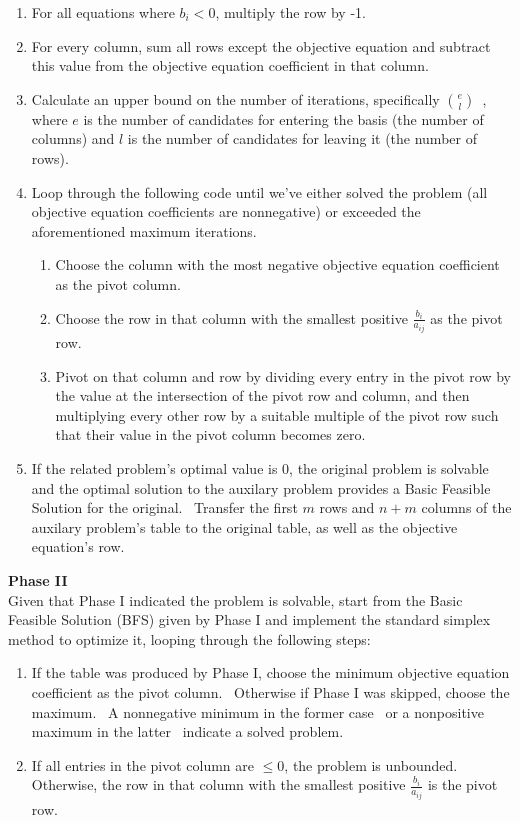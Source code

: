 \documentclass[11pt]{article}
\begin{document}
\begin{enumerate}
\item For all equations where $b_i < 0$, multiply the row by -1.~\cite{wolfram}
\item For every column, sum all rows except the objective equation and subtract this value from the objective equation coefficient in that column.~\cite{wolfram}
\item Calculate an upper bound on the number of iterations, specifically $e \choose l$~\cite{chvatal83}, where $e$ is the number of candidates for entering the basis (the number of columns) and $l$ is the number of candidates for leaving it (the number of rows). 
\item Loop through the following code until we've either solved the problem (all objective equation coefficients are nonnegative) or exceeded the aforementioned maximum iterations.
  \begin{enumerate}
  \item Choose the column with the most negative objective equation coefficient as the pivot column.~\cite{wolfram}
  \item Choose the row in that column with the smallest positive $\frac{b_i}{a_{ij}}$ as the pivot row.~\cite{wolfram}
  \item Pivot on that column and row by dividing every entry in the pivot row by the value at the intersection of the pivot row and column, and then multiplying every other row by a suitable multiple of the pivot row such that their value in the pivot column becomes zero.~\cite{chvatal83}
  \end{enumerate}
\item If the related problem's optimal value is 0, the original problem is solvable and the optimal solution to the auxilary problem provides a Basic Feasible Solution for the original.~\cite{chvatal83} Transfer the first $m$ rows and $n+m$ columns of the auxilary problem's table to the original table, as well as the objective equation's row.
\end{enumerate}
\noindent \textbf{Phase II}\\
Given that Phase I indicated the problem is solvable, start from the Basic Feasible Solution (BFS) given by Phase I and implement the standard simplex method to optimize it, looping through the following steps:
\begin{enumerate}
\item If the table was produced by Phase I, choose the minimum objective equation coefficient as the pivot column.~\cite{chvatal83} Otherwise if Phase I was skipped, choose the maximum.~\cite{wolfram} A nonnegative minimum in the former case~\cite{chvatal83} or a nonpositive maximum in the latter~\cite{wolfram} indicate a solved problem.
\item If all entries in the pivot column are $\leq 0$, the problem is unbounded.~\cite{chvatal83} Otherwise, the row in that column with the smallest positive $\frac{b_i}{a_{ij}}$ is the pivot row.~\cite{chvatal83}
\end{enumerate}
\end{document}
